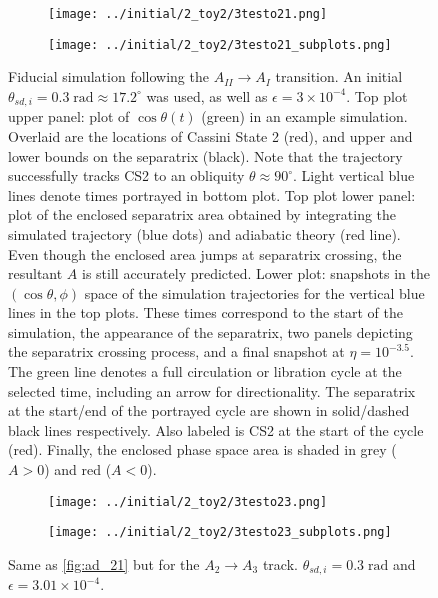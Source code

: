 \documentclass[
        fleqn,
        usenatbib,
        referee,
    ]{mnras}
\newcommand*{\p}[1]{\left(#1\right)}
\begin{document}
\begin{figure}
    \centering
    \begin{subfigure}{\columnwidth}
        \centering
        \texttt{[image: ../initial/2\_toy2/3testo21.png]}
    \end{subfigure}
    \begin{subfigure}{\columnwidth}
        \centering
        \texttt{[image: ../initial/2\_toy2/3testo21\_subplots.png]}
    \end{subfigure}
    \caption{Fiducial simulation following the $A_{II} \to A_{I}$ transition. An
    initial $\theta_{sd, i} = 0.3\;\mathrm{rad} \approx 17.2^\circ$ was used, as
    well as $\epsilon = 3 \times 10^{-4}$. Top plot upper panel: plot of $\cos
    \theta(t)$ (green) in an example simulation. Overlaid are the locations of
    Cassini State 2 (red), and upper and lower bounds on the separatrix (black).
    Note that the trajectory successfully tracks CS2 to an obliquity $\theta
    \approx 90^\circ$. Light vertical blue lines denote times portrayed in
    bottom plot. Top plot lower panel: plot of the enclosed separatrix area
    obtained by integrating the simulated trajectory (blue dots) and adiabatic
    theory (red line). Even though the enclosed area jumps at separatrix
    crossing, the resultant $A$ is still accurately predicted. Lower plot:
    snapshots in the $\p{\cos \theta, \phi}$ space of the simulation
    trajectories for the vertical blue lines in the top plots. These times
    correspond to the start of the simulation, the appearance of the separatrix,
    two panels depicting the separatrix crossing process, and a final snapshot
    at $\eta = 10^{-3.5}$. The green line denotes a full circulation or
    libration cycle at the selected time, including an arrow for directionality.
    The separatrix at the start/end of the portrayed cycle are shown in
    solid/dashed black lines respectively. Also labeled is CS2 at the start of
    the cycle (red). Finally, the enclosed phase space area is shaded in grey
    ($A > 0$) and red ($A < 0$).}\label{fig:ad_21}
\end{figure}
\begin{figure}
    \centering
    \begin{subfigure}{\columnwidth}
        \centering
        \texttt{[image: ../initial/2\_toy2/3testo23.png]}
    \end{subfigure}
    \begin{subfigure}{\columnwidth}
        \centering
        \texttt{[image: ../initial/2\_toy2/3testo23\_subplots.png]}
    \end{subfigure}
    \caption{Same as \autoref{fig:ad_21} but for the $A_2 \to A_3$ track.
    $\theta_{sd, i} = 0.3\;\mathrm{rad}$ and $\epsilon = 3.01 \times
    10^{-4}$.}\label{fig:ad_23}
\end{figure}
\end{document}
